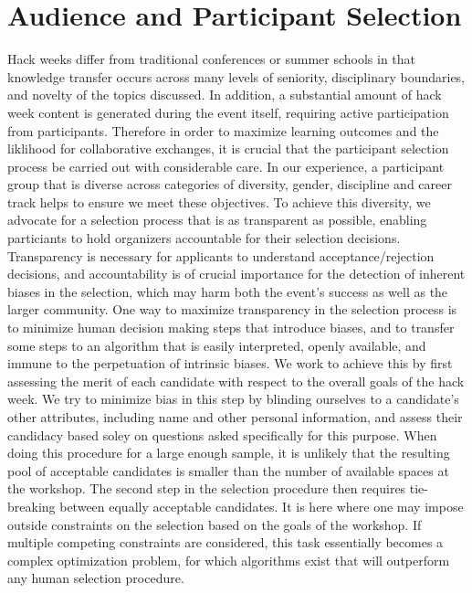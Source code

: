 \section*{Audience and Participant Selection}

Hack weeks differ from traditional conferences or summer schools in that knowledge transfer occurs across many levels of seniority, disciplinary boundaries, and novelty of the topics discussed.
In addition, a substantial amount of hack week content is generated during the event itself, requiring active participation from participants.
Therefore in order to maximize learning outcomes and the liklihood for collaborative exchanges, it is crucial that the participant selection process be carried out with considerable care.
In our experience, a participant group that is diverse across categories of diversity, gender, discipline and career track helps to ensure we meet these objectives. 
To achieve this diversity, we advocate for a selection process that is as transparent as possible, enabling particiants to hold organizers accountable for their selection decisions.
Transparency is necessary for applicants to understand acceptance/rejection decisions, and accountability is of crucial importance for the detection of inherent biases in the selection, which may harm both the event's success as well as the larger community.
One way to maximize transparency in the selection process is to minimize human decision making steps that introduce biases, and to transfer some steps to an algorithm that is easily interpreted, openly available, and immune to the perpetuation of intrinsic biases. 
We work to achieve this by first assessing the merit of each candidate with respect to the overall goals of the hack week.
We try to minimize bias in this step by blinding ourselves to a candidate's other attributes, including name and other personal information, and assess their candidacy based soley on questions asked specifically for this purpose.
When doing this procedure for a large enough sample, it is unlikely that the resulting pool of acceptable candidates is smaller than the number of available spaces at the workshop.
The second step in the selection procedure then requires tie-breaking between equally acceptable candidates.
It is here where one may impose outside constraints on the selection based on the goals of the workshop.
If multiple competing constraints are considered, this task essentially becomes a complex optimization problem, for which algorithms exist that will outperform any human selection procedure.

